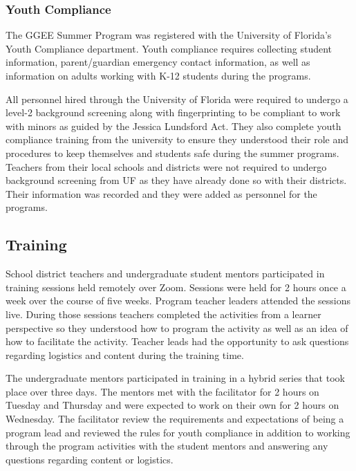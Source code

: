 \documentclass[
]{article}
\begin{document}
\hypertarget{youth-compliance}{%
\subsubsection{Youth Compliance}\label{youth-compliance}}

The GGEE Summer Program was registered with the University of Florida's
Youth Compliance department. Youth compliance requires collecting
student information, parent/guardian emergency contact information, as
well as information on adults working with K-12 students during the
programs.

All personnel hired through the University of Florida were required to
undergo a level-2 background screening along with fingerprinting to be
compliant to work with minors as guided by the Jessica Lundsford Act.
They also complete youth compliance training from the university to
ensure they understood their role and procedures to keep themselves and
students safe during the summer programs. Teachers from their local
schools and districts were not required to undergo background screening
from UF as they have already done so with their districts. Their
information was recorded and they were added as personnel for the
programs.

\hypertarget{training}{%
\subsection{Training}\label{training}}

School district teachers and undergraduate student mentors participated
in training sessions held remotely over Zoom. Sessions were held for 2
hours once a week over the course of five weeks. Program teacher leaders
attended the sessions live. During those sessions teachers completed the
activities from a learner perspective so they understood how to program
the activity as well as an idea of how to facilitate the activity.
Teacher leads had the opportunity to ask questions regarding logistics
and content during the training time.

The undergraduate mentors participated in training in a hybrid series
that took place over three days. The mentors met with the facilitator
for 2 hours on Tuesday and Thursday and were expected to work on their
own for 2 hours on Wednesday. The facilitator review the requirements
and expectations of being a program lead and reviewed the rules for
youth compliance in addition to working through the program activities
with the student mentors and answering any questions regarding content
or logistics.
\end{document}
